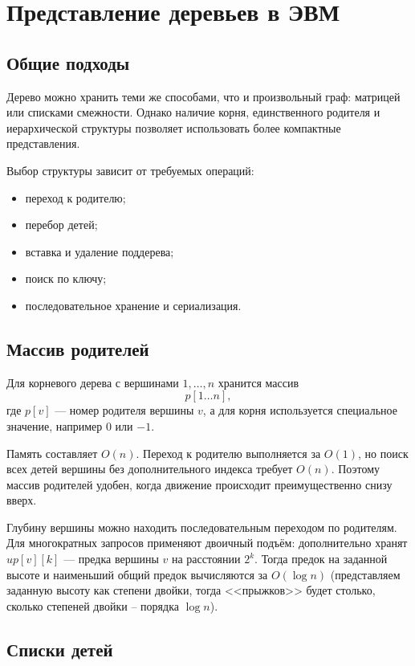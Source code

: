 \section{Представление деревьев в ЭВМ}
\label{sec:tree-representation}

\subsection{Общие подходы}

Дерево можно хранить теми же способами, что и произвольный граф: матрицей или списками смежности. Однако наличие корня, единственного родителя и иерархической структуры позволяет использовать более компактные представления.

Выбор структуры зависит от требуемых операций:
\begin{itemize}
    \item переход к родителю;
    \item перебор детей;
    \item вставка и удаление поддерева;
    \item поиск по ключу;
    \item последовательное хранение и сериализация.
\end{itemize}

\subsection{Массив родителей}

Для корневого дерева с вершинами $1,\ldots,n$ хранится массив
\[
    p[1\ldots n],
\]
где $p[v]$ --- номер родителя вершины $v$, а для корня используется специальное значение, например $0$ или $-1$.

Память составляет $O(n)$. Переход к родителю выполняется за $O(1)$, но поиск всех детей вершины без дополнительного индекса требует $O(n)$. Поэтому массив родителей удобен, когда движение происходит преимущественно снизу вверх.

Глубину вершины можно находить последовательным переходом по родителям. Для многократных запросов применяют двоичный подъём: дополнительно хранят $up[v][k]$ --- предка вершины $v$ на расстоянии $2^k$. Тогда предок на заданной высоте и наименьший общий предок вычисляются за $O(\log n)$ (представляем заданную высоту как степени двойки, тогда <<прыжков>> будет столько, сколько степеней двойки -- порядка $\log n$).

\subsection{Списки детей}

